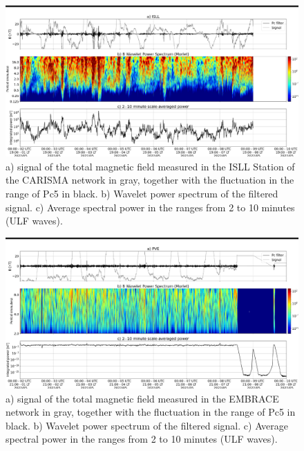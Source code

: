 \documentclass[a4paper, 10pt]{article}
\begin{document}
\begin{figure}[H]
    
                        \centering
   
                             \includegraphics[width=14cm]{./figures//figureULF_0.png}

                             \caption{a) signal of the total magnetic 
                              field measured in the ISLL Station of the CARISMA 
                              network in gray, together with the fluctuation in the 
                              range of Pc5 in black. b) Wavelet power spectrum of the 
                              filtered signal. c) Average spectral power in the ranges 
                              from 2 to 10 minutes (ULF waves).}
                        \end{figure}

                     \begin{figure}[H]
    
                        \centering
   
                             \includegraphics[width=14cm]{./figures//figureULF_1.png}

                             \caption{a) signal of the total magnetic field 
                              measured in the EMBRACE network in gray, together with
                               the fluctuation in the range of Pc5 in black. b)
                                Wavelet power spectrum of the filtered signal. c) 
                                Average spectral power in the ranges from 2 to 10
                                 minutes (ULF waves).}
                        \end{figure}
\end{document}

